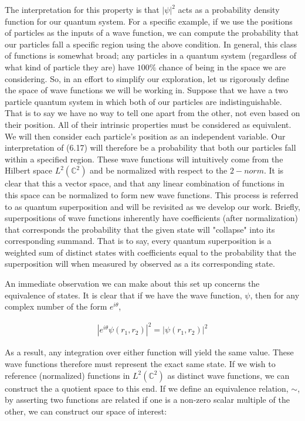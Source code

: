 \documentclass[10pt]{ucthesis}
\newcommand{\C}{\mathbb{C}}
\begin{document}
The interpretation for this property is that $|\psi|^2$ acts as a probability density function for our quantum system. For a specific example, if we use the positions of particles as the inputs of a wave function, we can compute the probability that our particles fall a specific region using the above condition. In general, this class of functions is somewhat broad; any particles in a quantum system (regardless of what kind of particle they are) have $100\%$ chance of being in the space we are considering. So, in an effort to simplify our exploration, let us rigorously define the space of wave functions we will be working in. Suppose that we have a two particle quantum system in which both of our particles are indistinguishable. That is to say we have no way to tell one apart from the other, not even based on their position. All of their intrinsic properties must be considered as equivalent. We will then consider each particle's position as an independent variable. Our interpretation of (6.17) will therefore be a probability that both our particles fall within a specified region. These wave functions will intuitively come from the Hilbert space $L^2(\C^2)$ and be normalized with respect to the $2-norm$. It is clear that this a vector space, and that any linear combination of functions in this space can be normalized to form new wave functions. This process is referred to as quantum superposition and will be revisited as we develop our work. Briefly, superpositions of wave functions inherently have coefficients (after normalization) that corresponds the probability that the given state will "collapse" into its corresponding summand. That is to say, every quantum superposition is a weighted sum of distinct states with coefficients equal to the probability that the superposition will when measured by observed as a its corresponding state.

An immediate observation we can make about this set up concerns the equivalence of states. It is clear that if we have the wave function, $\psi$, then for any complex number of the form $e^{i\theta}$,

\begin{equation}
	\begin{aligned}
		|e^{i\theta}\psi(r_1,r_2)|^2 = |\psi(r_1,r_2)|^2 
	\end{aligned}
\end{equation}

As a result, any integration over either function will yield the same value. These wave functions therefore must represent the exact same state. If we wish to reference (normalized) functions in $L^2(\C^2)$ as distinct wave functions, we can construct the a quotient space to this end. If we define an equivalence relation, $\sim$, by asserting two functions are related if one is a non-zero scalar multiple of the other, we can construct our space of interest:
\end{document}
